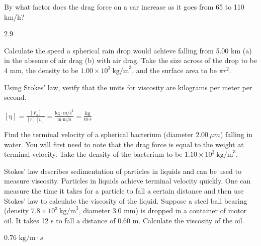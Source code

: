 \documentclass[
]{book}
\begin{document}
\hypertarget{fs-id1165298726139}{}
\leavevmode{}%
By what factor does the drag force on a car increase as it goes from 65
to 110 km/h?

\leavevmode{}%
\({2\text{.}9}{}\)

\hypertarget{fs-id1165298928445}{}
\leavevmode{}%
Calculate the speed a spherical rain drop would achieve falling from
5.00 km (a) in the absence of air drag (b) with air drag. Take the size
across of the drop to be 4 mm, the density to be
\({1\text{.}{\text{00} \times \text{10}^{3}}\ \text{kg/m}^{3}}{}\), and
the surface area to be \({\pi r}^{2}{}\).

\hypertarget{fs-id1165296534353}{}
\leavevmode{}%
Using Stokes' law, verify that the units for viscosity are kilograms
per meter per second.

\leavevmode{}%
\({{{\left\lbrack \eta \right\rbrack = \frac{\left\lbrack F_{\text{s}} \right\rbrack}{\left\lbrack r \right\rbrack\left\lbrack v \right\rbrack}} = \frac{\text{kg} \cdot \text{m/s}^{2}}{\text{m} \cdot \text{m/s}}} = \frac{\text{kg}}{\text{m} \cdot \text{s}}}{}\)

\hypertarget{fs-id1165298534706}{}
\leavevmode{}%
Find the terminal velocity of a spherical bacterium (diameter
\(2.00\ \mu m{}\)) falling in water. You will first need to note that the
drag force is equal to the weight at terminal velocity. Take the density
of the bacterium to be
\({1\text{.}{\text{10} \times \text{10}^{3}\ }\text{kg/m}^{3}}{}\).

\hypertarget{fs-id1165298696745}{}
\leavevmode{}%
Stokes' law describes sedimentation of particles in liquids and can be
used to measure viscosity. Particles in liquids achieve terminal
velocity quickly. One can measure the time it takes for a particle to
fall a certain distance and then use Stokes' law to calculate the
viscosity of the liquid. Suppose a steel ball bearing (density
\({7\text{.}{8 \times \text{10}^{3}}\ \text{kg/m}^{3}}{}\), diameter
\({3\text{.0\ \ mm}}{}\)) is dropped in a container of motor oil. It takes
12 s to fall a distance of 0.60 m. Calculate the viscosity of the oil.

\leavevmode{}%
\(0\text{.}\text{76\ kg/m} \cdot s\)
\end{document}
